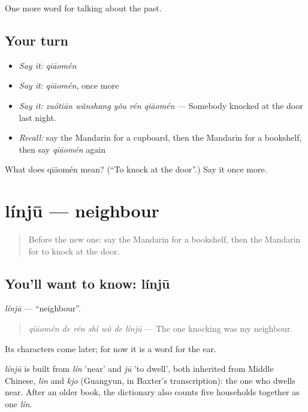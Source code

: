 \begin{grammarlens}[title={What you've built}]
One more word for talking about the past.
\end{grammarlens}

\subsection*{Your turn}
\begin{itemize}
\raggedright
  \item \emph{Say it:} \emph{qiāomén}
  \item \emph{Say it:} \emph{qiāomén}, once more
  \item \emph{Say it:} \emph{zuótiān wǎnshang yǒu rén qiāomén} — Somebody knocked at the door last night.
  \item \emph{Recall:} say the Mandarin for a cupboard, then the Mandarin for a bookshelf, then say \emph{qiāomén} again
\end{itemize}

\begin{tcolorbox}[breakable,colback=teal!4,colframe=teal!35!black,title={Before you move on}]
What does qiāomén mean? (\textquotedblleft{}To knock at the door\textquotedblright{}.) Say it once more.
\end{tcolorbox}
\section[línjū]{línjū — neighbour}

\label{lesson:ZH-C176-linju}



\begin{quote}
Before the new one: say the Mandarin for a bookshelf, then the Mandarin for to knock at the door.
\end{quote}

\subsection*{You'll want to know: línjū}
\emph{línjū} — \textquotedblleft{}neighbour\textquotedblright{}.

\begin{quote}
\emph{qiāomén de rén shì wǒ de línjū} — The one knocking was my neighbour.
\end{quote}

Its characters come later; for now it is a word for the ear.

\begin{cousinweb}
\emph{línjū} is built from \emph{lín} 'near' and \emph{jū} 'to dwell', both inherited from Middle Chinese, \emph{lin} and \emph{kjo} (Guangyun, in Baxter's transcription): the one who dwells near. After an older book, the dictionary also counts five households together as one \emph{lín}.
\end{cousinweb}

